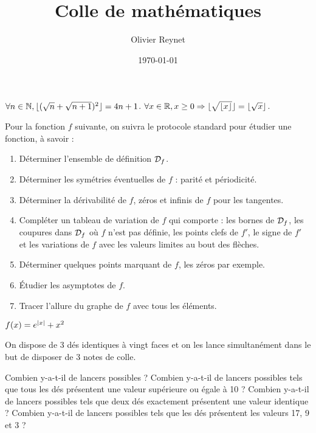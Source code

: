 \documentclass[french,12pt,a4paper]{article}
\author{Olivier Reynet}
\title{Colle de mathématiques}
\date{\today}
\begin{document}
\maketitle

\begin{exercise}[subtitle= Racine carrée et  partie entière]
	\begin{tasks}
		\task \Mq $\forall n \in \mathbb{N}, \lfloor ( \sqrt{n} + \sqrt{n+1})^2 \rfloor = 4n +1$.
		\task \Mq  $\forall x \in \mathbb{R}, x \ge 0 \Rightarrow \lfloor \sqrt{\lfloor x \rfloor}\rfloor = \lfloor \sqrt{x} \rfloor$.
	\end{tasks}
\end{exercise}


\begin{exercise}[subtitle= Étude d'une fonction]
	Pour la fonction $f$ suivante, on suivra le protocole standard pour étudier une fonction, à savoir :
	\begin{enumerate}
		\item Déterminer l'ensemble de définition $\mathcal{D}_f$.
		\item Déterminer les symétries éventuelles de $f$ : parité et périodicité.
		\item Déterminer la dérivabilité de $f$,  zéros et infinis de $f$ pour les tangentes.
		\item Compléter un tableau de variation de $f$ qui comporte : les bornes de $\mathcal{D}_f$, les coupures dans $\mathcal{D}_f$ où $f$ n'est pas définie, les points clefs de $f'$, le signe de $f'$ et les variations de $f$ avec les valeurs limites au bout des flèches.
		\item Déterminer quelques points marquant de $f$, les zéros par exemple.
		\item Étudier les asymptotes de $f$.
		\item Tracer l'allure du graphe de $f$ avec tous les éléments.
	\end{enumerate}

	 $f(x)= e^{\mid x \mid}+x^2$

\end{exercise}

	\begin{exercise}[subtitle= Dé à 20 faces]
		On dispose de 3 dés identiques à vingt faces et on les lance simultanément dans le but de disposer de 3 notes de colle. 
		\begin{tasks}
			\task Combien y-a-t-il de lancers possibles ?
			\task Combien y-a-t-il de lancers possibles tels que tous les dés présentent une valeur supérieure ou égale à 10 ?
			\task Combien y-a-t-il de lancers possibles tels que deux dés exactement présentent une valeur identique ? 
			\task Combien y-a-t-il de lancers possibles tels que les dés présentent  les valeurs 17, 9 et 3 ?
		\end{tasks}
	\end{exercise}
\end{document}
